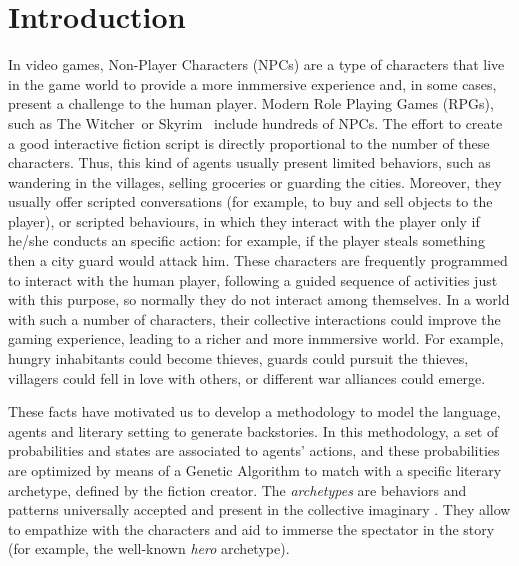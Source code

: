 \documentclass{sig-alternate}
\begin{document}






%
%
\section{Introduction}
\label{sec:intro}

In video games, Non-Player Characters (NPCs)  are a type of characters
that live in the game world to provide a more inmmersive
experience and, in some cases, present a challenge to the human player. Modern  Role Playing Games (RPGs), such as The
Witcher\texttrademark~or Skyrim\texttrademark~ include hundreds of NPCs. The effort to create a good interactive fiction script is directly proportional to the number of these characters. Thus, this kind of agents usually present limited behaviors, such as wandering in the villages, selling groceries or guarding the cities. Moreover, they usually offer scripted conversations (for example, to buy and sell objects to the player), or scripted behaviours, in which they interact with the player only if he/she conducts an specific action: for example, if the player steals something then a city guard would attack him. These characters are frequently programmed to interact with the human player, following a guided sequence of activities just with this purpose, so normally they do not interact among themselves. In a world with such a number of characters, their collective interactions could improve the gaming experience, leading to a richer and more inmmersive world. For example, hungry inhabitants could become thieves, guards could pursuit the thieves, villagers could fell in love with others, or different war alliances could emerge.


These facts have motivated us to develop a methodology to model the language, agents and literary setting to generate backstories. In this methodology, a set of probabilities and 
states are associated to agents' actions, and these probabilities are
optimized by means of a Genetic Algorithm to match with a
specific literary archetype, defined by the fiction creator. The {\em
archetypes} are behaviors and patterns universally accepted and
present in the collective imaginary
 \cite{ArchetypesGarry05}. They allow to empathize  %
with the characters and aid to immerse the spectator in the story
(for example, the well-known {\em hero} archetype).
\end{document}
